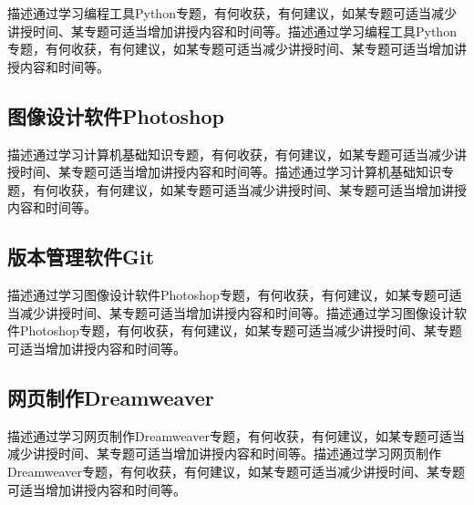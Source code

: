 \documentclass[supercite]{Experimental_Report}
\theoremstyle{definition}
\begin{document}
描述通过学习编程工具Python专题，有何收获，有何建议，如某专题可适当减少讲授时间、某专题可适当增加讲授内容和时间等。描述通过学习编程工具Python专题，有何收获，有何建议，如某专题可适当减少讲授时间、某专题可适当增加讲授内容和时间等。

\subsection{图像设计软件Photoshop}

描述通过学习计算机基础知识专题，有何收获，有何建议，如某专题可适当减少讲授时间、某专题可适当增加讲授内容和时间等。描述通过学习计算机基础知识专题，有何收获，有何建议，如某专题可适当减少讲授时间、某专题可适当增加讲授内容和时间等。

\subsection{版本管理软件Git}

描述通过学习图像设计软件Photoshop专题，有何收获，有何建议，如某专题可适当减少讲授时间、某专题可适当增加讲授内容和时间等。描述通过学习图像设计软件Photoshop专题，有何收获，有何建议，如某专题可适当减少讲授时间、某专题可适当增加讲授内容和时间等。

\subsection{网页制作Dreamweaver}

描述通过学习网页制作Dreamweaver专题，有何收获，有何建议，如某专题可适当减少讲授时间、某专题可适当增加讲授内容和时间等。描述通过学习网页制作Dreamweaver专题，有何收获，有何建议，如某专题可适当减少讲授时间、某专题可适当增加讲授内容和时间等。


\nocite{*} %

%
%
\end{document}
